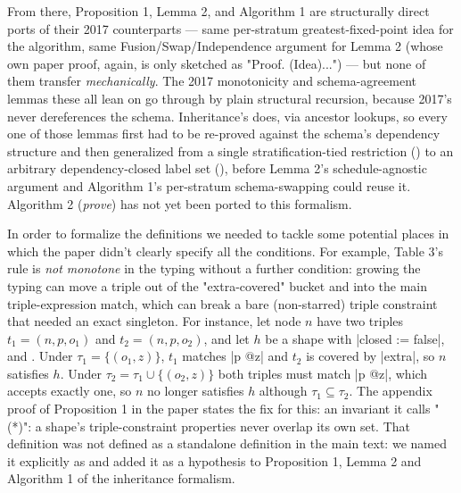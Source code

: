 From there, Proposition 1, Lemma 2, and Algorithm 1 are structurally direct
ports of their 2017 counterparts — same per-stratum greatest-fixed-point
idea for the algorithm, same Fusion/Swap/Independence argument for Lemma 2
(whose own paper proof, again, is only sketched as "Proof. (Idea)...") —
but none of them transfer \emph{mechanically}. 
The 2017 monotonicity and schema-agreement lemmas these all lean on go through by plain structural
recursion, because 2017's  never dereferences the schema.
Inheritance's  does, via ancestor lookups, so every one of those
lemmas first had to be re-proved against the schema's dependency structure
and then generalized from a single stratification-tied restriction
() to an arbitrary dependency-closed label set
(), before Lemma 2's schedule-agnostic argument and
Algorithm 1's per-stratum schema-swapping could reuse it. Algorithm 2
(\emph{prove}) has not yet been ported to this formalism.

In order to formalize the definitions we needed to tackle some potential
 places in which the paper didn't clearly specify all the conditions.  
For example, Table 3's  rule is
\emph{not monotone} in the typing without a further condition: 
growing the typing can move a triple out of the "extra-covered" bucket and 
into the main triple-expression match, which can break a bare 
(non-starred) triple constraint that needed an exact singleton. 
For instance, let node $n$ have two triples $t_1=(n,p,o_1)$ and
$t_2=(n,p,o_2)$, and let $h$ be a shape with \lean|closed := false|, 
 and 
.
Under $\tau_1=\{(o_1,z)\}$, $t_1$ matches \lean|p @z| and 
$t_2$ is covered by \lean|extra|, 
so $n$ satisfies $h$. Under $\tau_2=\tau_1\cup\{(o_2,z)\}$
both triples must match \lean|p @z|, which accepts exactly one, 
so $n$ no
longer satisfies $h$ although $\tau_1 \subseteq \tau_2$.
The appendix proof of Proposition 1 in the paper states the fix for this: 
an invariant it calls "(*)": a shape's triple-constraint properties 
never overlap its own  set. 
That definition was not defined as a standalone definition 
in the main text: we named it explicitly as  and 
added it as a hypothesis to Proposition 1, Lemma 2 and Algorithm 1 of the inheritance formalism.

